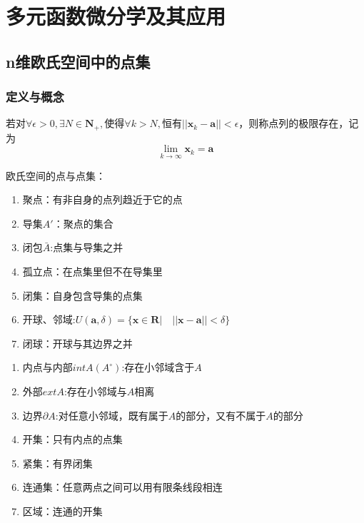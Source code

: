 \section{多元函数微分学及其应用}
\subsection{n维欧氏空间中的点集}
\subsubsection{定义与概念}
\begin{definition}[点列极限]
	若对$\forall \epsilon>0,\exists N\in \textbf{N}_+,$使得$ \forall k>N, $恒有$ ||\bm{x}_k - \bm{a}||<\epsilon $，则称点列的极限存在，记为
	\begin{equation}\label{key}
		\lim\limits_{k\to \infty}\bm{x}_k=\bm{a}
	\end{equation}
\end{definition}
\begin{definition}
	欧氏空间的点与点集：
	\begin{enumerate}
		\item 聚点：有非自身的点列趋近于它的点
		\item 导集$ A' $：聚点的集合
		\item 闭包$ \bar{A} $:点集与导集之并
		\item 孤立点：在点集里但不在导集里
		\item 闭集：自身包含导集的点集
		\item 开球、邻域:$ U(\bm{a},\delta)=\{\bm{x}\in \mathbf{R} |\quad ||\bm{x}-\bm{a}||<\delta \} $
		\item 闭球：开球与其边界之并
	\end{enumerate}
\end{definition}
\begin{definition}
	\begin{enumerate}
		\item 内点与内部$ int A (A^\circ) $:存在小邻域含于$ A $
		\item 外部$ ext A $:存在小邻域与$ A $相离
		\item 边界$ \partial A $:对任意小邻域，既有属于$ A $的部分，又有不属于$ A $的部分
		\item 开集：只有内点的点集
		\item 紧集：有界闭集
		\item 连通集：任意两点之间可以用有限条线段相连
		\item 区域：连通的开集
	\end{enumerate}
	
\end{definition}
